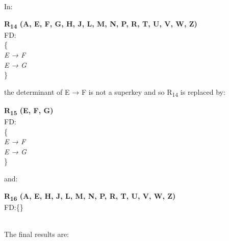 In:\\

\begin{adjustwidth}{2cm}{}
\textbf{R\textsubscript{14} (A, E, F, G, H, J, L, M, N, P, R, T, U, V, W, Z)}\\
FD:\\
\{\\
\textit{ 
E → F\\
E → G\\
}
\} \\
\end{adjustwidth} 

the determinant of E → F is not a superkey and so R\textsubscript{14} is replaced by:

\begin{adjustwidth}{2cm}{}
\textbf{R\textsubscript{15} (E, F, G)}\\
FD:\\
\{\\
\textit{ 
E → F\\
E → G\\
}
\} \\
\end{adjustwidth}

and:\\

\begin{adjustwidth}{2cm}{}
\textbf{R\textsubscript{16} (A, E, H, J, L, M, N, P, R, T, U, V, W, Z)}\\
FD:\{\} \\ \\
\end{adjustwidth}

The final results are:\\

